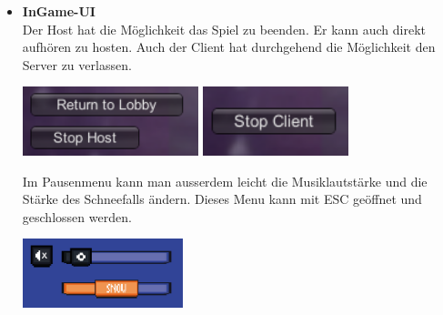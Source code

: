 \begin{itemize}
\begin {itemize}
        \item \textbf{InGame-UI}\\
            Der Host hat die Möglichkeit das Spiel zu beenden. Er kann auch direkt aufhören zu hosten. 
            Auch der Client hat durchgehend die Möglichkeit den Server zu verlassen.
            \begin{center}
                \includegraphics*[height=2cm]{resources/returnlobby.png} \includegraphics*[height=2cm]{resources/stopclient.png}\\
            \end{center}
            Im Pausenmenu kann man ausserdem leicht die Musiklautstärke und die Stärke des Schneefalls ändern. Dieses Menu kann mit ESC geöffnet und geschlossen werden.
            \begin{center}
                \includegraphics*[height=2cm]{resources/pause.png}\\
            \end{center}
            
            


    \end {itemize}


\end{itemize}
